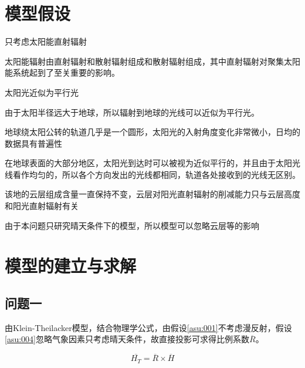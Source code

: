 \documentclass[withoutpreface,bwprint]{cumcmthesis} %
\begin{document}
\bigskip













\section{模型假设}

\begin{assumption}
	只考虑太阳能直射辐射
	\label{asu:001}
\end{assumption}
太阳能辐射由直射辐射和散射辐射组成和散射辐射组成，其中直射辐射对聚集太阳能系统起到了至关重要的影响。
\begin{assumption}
	太阳光近似为平行光
	\label{asu:002}
\end{assumption}
由于太阳半径远大于地球，所以辐射到地球的光线可以近似为平行光。
\begin{assumption}
	地球绕太阳公转的轨道几乎是一个圆形，太阳光的入射角度变化非常微小，日均的数据具有普遍性
	\label{asu:003}
\end{assumption}
在地球表面的大部分地区，太阳光到达时可以被视为近似平行的，并且由于太阳光线看作均匀的，所以各个方向发出的光线都相同，轨道各处接收到的光线无区别。
\begin{assumption}
	该地的云层组成含量一直保持不变，云层对阳光直射辐射的削减能力只与云层高度和阳光直射辐射有关
	\label{asu:004}
\end{assumption}
由于本问题只研究晴天条件下的模型，所以模型可以忽略云层等的影响














\section{模型的建立与求解}
\subsection{问题一}


由Klein-Theilacker模型\cite{7}，结合物理学公式，由假设\ref{asu:001}不考虑漫反射，假设\ref{asu:004}忽略气象因素只考虑晴天条件，故直接投影可求得比例系数$\overline{R}$。

\begin{equation}
	\overline{H_{T}} = \overline{R} \times \overline{H}
	\label{eq:001}
\end{equation}
\end{document}
